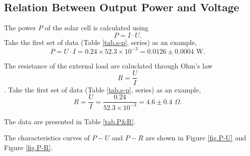 \documentclass{article}
\begin{document}
{\subsection{Relation Between Output Power and Voltage}

The power $P$ of the solar cell is calculated using 
$$
P=I\cdot U.
$$
Take the first set of data (Table \ref{tab.s-p}, series) as an example,
$$P = U\cdot I = 0.24 \times 52.3 \times 10^{-3} = 0.0126 \pm 0.0004\,\,\text{W}.$$

The resistance of the external load are caluclated through Ohm's law 
$$\displaystyle R = \frac{U}{I}$$. 
Take the first set of data (Table \ref{tab.s-p}, series) as an example,
$$R = \frac{U}{I} = \frac{0.24}{52.3\times 10^{-3}} = 4.6 \pm 0.4\,\,\Omega.$$

The data are presented in Table \ref{tab.P&R}.

The characteristics curves of $P-U$ and $P-R$ are shown in Figure \ref{fig.P-U} and Figure \ref{fig.P-R}.


}
\end{document}
